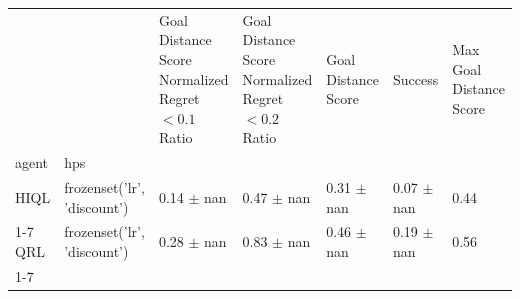 \begin{tabular}{lllllll}
\toprule
 &  & Goal Distance Score Normalized Regret $< 0.1$ Ratio & Goal Distance Score Normalized Regret $< 0.2$ Ratio & Goal Distance Score & Success & Max Goal Distance Score \\
agent & hps &  &  &  &  &  \\
\midrule
HIQL & frozenset({'lr', 'discount'}) & 0.14 $\pm$ nan & 0.47 $\pm$ nan & 0.31 $\pm$ nan & 0.07 $\pm$ nan & 0.44 \\
\cline{1-7}
QRL & frozenset({'lr', 'discount'}) & 0.28 $\pm$ nan & 0.83 $\pm$ nan & 0.46 $\pm$ nan & 0.19 $\pm$ nan & 0.56 \\
\cline{1-7}
\bottomrule
\end{tabular}
